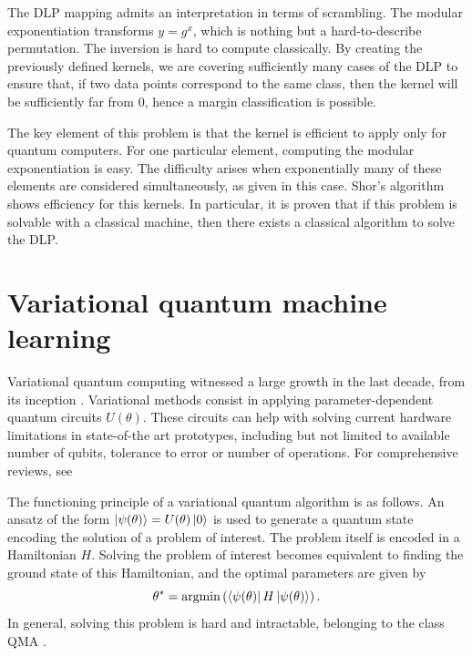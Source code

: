 \documentclass[]{report}
\begin{document}
The DLP mapping admits an interpretation in terms of scrambling. The modular exponentiation transforms $y = g^x$, which is nothing but a hard-to-describe permutation. The inversion is hard to compute classically. By creating the previously defined kernels, we are covering sufficiently many cases of the DLP to ensure that, if two data points correspond to the same class, then the kernel will be sufficiently far from $0$, hence a margin classification is possible. 


The key element of this problem is that the kernel is efficient to apply only for quantum computers. For one particular element, computing the modular exponentiation is easy. The difficulty arises when exponentially many of these elements are considered simultaneously, as given in this case. Shor's algorithm \cite{shor1997polynomialtime} shows efficiency for this kernels. In particular, it is proven that if this problem is solvable with a classical machine, then there exists a classical algorithm to solve the DLP.  

\section{Variational quantum machine learning}\label{sec.variational}

Variational quantum computing witnessed a large growth in the last decade, from its inception \cite{peruzzo2014variational}. Variational methods consist in applying parameter-dependent quantum circuits $U(\theta)$. These circuits can help with solving current hardware limitations in state-of-the art prototypes, including but not limited to available number of qubits, tolerance to error or number of operations. For comprehensive reviews, see \cite{bharti2022noisy, cerezo2021variational}

The functioning principle of a variational quantum algorithm is as follows. An ansatz of the form $\ket{\psi(\theta)} = U(\theta)\ket 0$ is used to generate a quantum state encoding the solution of a problem of interest. The problem itself is encoded in a Hamiltonian $H$. Solving the problem of interest becomes equivalent to finding the ground state of this Hamiltonian, and the optimal parameters are given by
\begin{equation}
\theta^* = \operatorname{argmin}\left( \bra{\psi(\theta)}H\ket{\psi(\theta)}\right).
\end{equation}
In general, solving this problem is hard and intractable, belonging to the class QMA \cite{kempe2005complexity}.
\end{document}
